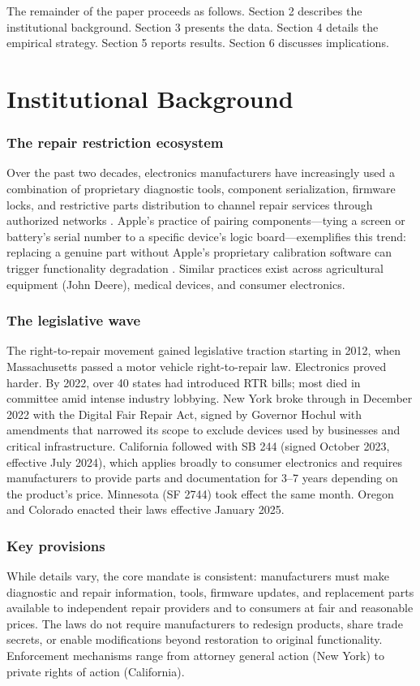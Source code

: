 \documentclass[12pt]{article}
\begin{document}
The remainder of the paper proceeds as follows. Section 2 describes the institutional background. Section 3 presents the data. Section 4 details the empirical strategy. Section 5 reports results. Section 6 discusses implications.

\section{Institutional Background}

\subsubsection*{The repair restriction ecosystem} Over the past two decades, electronics manufacturers have increasingly used a combination of proprietary diagnostic tools, component serialization, firmware locks, and restrictive parts distribution to channel repair services through authorized networks \citep{perzanowski2022right}. Apple's practice of pairing components---tying a screen or battery's serial number to a specific device's logic board---exemplifies this trend: replacing a genuine part without Apple's proprietary calibration software can trigger functionality degradation \citep{koebler2020repair}. Similar practices exist across agricultural equipment (John Deere), medical devices, and consumer electronics.

\subsubsection*{The legislative wave} The right-to-repair movement gained legislative traction starting in 2012, when Massachusetts passed a motor vehicle right-to-repair law. Electronics proved harder. By 2022, over 40 states had introduced RTR bills; most died in committee amid intense industry lobbying. New York broke through in December 2022 with the Digital Fair Repair Act, signed by Governor Hochul with amendments that narrowed its scope to exclude devices used by businesses and critical infrastructure. California followed with SB 244 (signed October 2023, effective July 2024), which applies broadly to consumer electronics and requires manufacturers to provide parts and documentation for 3--7 years depending on the product's price. Minnesota (SF 2744) took effect the same month. Oregon and Colorado enacted their laws effective January 2025.

\subsubsection*{Key provisions} While details vary, the core mandate is consistent: manufacturers must make diagnostic and repair information, tools, firmware updates, and replacement parts available to independent repair providers and to consumers at fair and reasonable prices. The laws do not require manufacturers to redesign products, share trade secrets, or enable modifications beyond restoration to original functionality. Enforcement mechanisms range from attorney general action (New York) to private rights of action (California).
\end{document}
